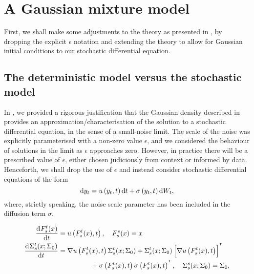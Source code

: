 \chapter{A Gaussian mixture model}\label{ch:gmm}


First, we shall make some adjustments to the theory as presented in , by dropping the explicit \(\epsilon\) notation and extending the theory to allow for Gaussian initial conditions to our stochastic differential equation.


\section{The deterministic model versus the stochastic model}

In , we provided a rigorous justification that the Gaussian density described in  provides an approximation/characterisation of the solution to a stochastic differential equation, in the sense of a small-noise limit.
The scale of the noise was explicitly parameterised with a non-zero value \(\epsilon\), and we considered the behaviour of solutions in the limit as \(\epsilon\) approaches zero.
However, in practice there will be a prescribed value of \(\epsilon\), either chosen judiciously from context or informed by data.
Henceforth, we shall drop the use of \(\epsilon\) and instead consider stochastic differential equations of the form
\[
	\sde{y_t}{u\left(y_t, t\right)}{\sigma\left(y_t, t\right)},
\]
where, strictly speaking, the noise scale parameter has been included in the diffusion term \(\sigma\).

\begin{subequations}\label{eqn:gauss_de}
	\begin{align}
		\dod{F_s^t(x)}{t}                & = u\left(F_s^t(x), t\right), \quad F_s^s(x) = x \label{eqn:gauss_mean_de}                                                              \\
		\dod{\Sigma_s^t(x; \Sigma_0)}{t} & = \begin{multlined}[t]
			                                     \nabla u\left(F_s^t(x), t\right) \Sigma_s^t(x; \Sigma_0) + \Sigma_s^t(x; \Sigma_0)\left[\nabla u\left(F_s^t(x), t\right)\right]^{\T} \\
			                                     + \sigma\left(F_s^t(x), t \right)\sigma\left(F_s^t(x), t\right)^{\T}, \quad \Sigma_s^s(x; \Sigma_0) = \Sigma_0,
		                                     \end{multlined}
		\label{eqn:gauss_cov_de}
	\end{align}
\end{subequations}



